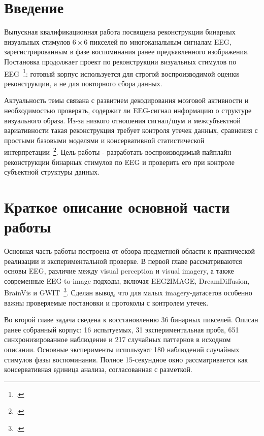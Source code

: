 \documentclass[
    14pt,
    candidate,
    times
]{disser}
\begin{document}


\newpage
\renewcommand{\contentsname}{\centerline{\large СОДЕРЖАНИЕ}}
\tableofcontents

\section*{Введение}

Выпускная квалификационная работа посвящена реконструкции бинарных визуальных
стимулов $6 \times 6$ пикселей по многоканальным сигналам EEG,
зарегистрированным в фазе воспоминания ранее предъявленного изображения.
Постановка продолжает проект по реконструкции визуальных стимулов по
EEG~\footcite{dementyev2025visualstimuli}: готовый корпус используется для
строгой воспроизводимой оценки реконструкции, а не для повторного сбора данных.

Актуальность темы связана с развитием декодирования мозговой активности и
необходимостью проверять, содержит ли EEG-сигнал информацию о структуре
визуального образа. Из-за низкого отношения сигнал/шум и межсубъектной
вариативности такая реконструкция требует контроля утечек данных, сравнения с
простыми базовыми моделями и консервативной статистической
интерпретации~\footcite{10.1088/1741-2552/aab2f2}. Цель работы - разработать
воспроизводимый пайплайн реконструкции бинарных стимулов по EEG и проверить
его при контроле субъектной структуры данных.

\section*{Краткое описание основной части работы}

Основная часть работы построена от обзора предметной области к практической
реализации и экспериментальной проверке. В первой главе рассматриваются основы
EEG, различие между visual perception и visual imagery, а также современные
EEG-to-image подходы, включая EEG2IMAGE, DreamDiffusion, BrainVis и
GWIT~\footcite{10.48550/arxiv.2412.19999}. Сделан вывод, что для малых
imagery-датасетов особенно важны проверяемые постановки и протоколы с
контролем утечек.

Во второй главе задача сведена к восстановлению 36 бинарных пикселей. Описан
ранее собранный корпус: 16 испытуемых, 31 экспериментальная проба, 651
синхронизированное наблюдение и 217 случайных паттернов в исходном описании.
Основные эксперименты используют 180 наблюдений случайных стимулов фазы
воспоминания. Полное 15-секундное окно рассматривается как консервативная
единица анализа, согласованная с разметкой.
\end{document}
